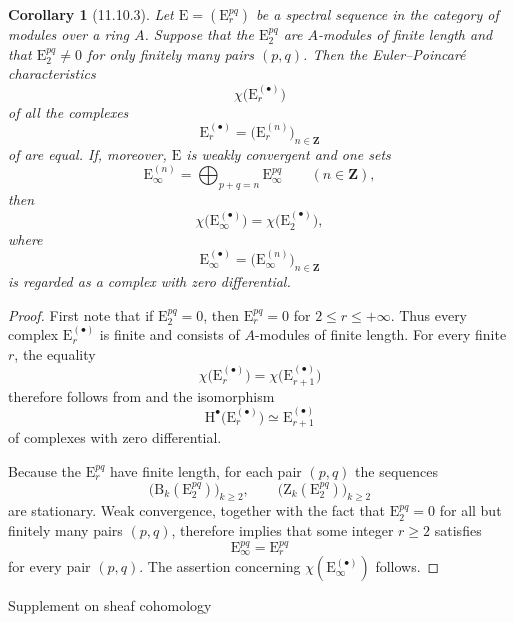 \documentclass[oneside]{amsart}
\makeatletter
\theoremstyle{ega-env-style}
\theoremstyle{ega-thm-env-style}
\newtheorem*{corollary}{Corollary}
\theoremstyle{ega-defn-env-style}
\def\section{\@startsection{section}{1}%
  \z@{.7\linespacing\@plus\linespacing}{.5\linespacing}%
  {\normalfont\bfseries\Large\scshape\centering}}
\def\bb{\mathbf}                    %
\def\leq{\leqslant}                 %
\def\geq{\geqslant}                 %
\def\HH{\mathrm{H}}                 %
\let\EGAOriginalLabel\label
\renewcommand{\label}[1]{\phantomsection\EGAOriginalLabel{#1}}
\makeatother
\begin{document}
\begin{corollary}[11.10.3]
\label{0.11.10.3}
Let $\mathrm{E}=(\mathrm{E}_r^{pq})$ be a spectral sequence in the
category of modules over a ring $A$.
Suppose that the $\mathrm{E}_2^{pq}$ are $A$-modules of finite length and
that $\mathrm{E}_2^{pq}\neq0$ for only finitely many pairs $(p,q)$.
Then the Euler--Poincar\'e characteristics
\[
  \chi\bigl(\mathrm{E}_r^{(\bullet)}\bigr)
\]
of all the complexes
\[
  \mathrm{E}_r^{(\bullet)}
  =
  \bigl(\mathrm{E}_r^{(n)}\bigr)_{n\in\bb{Z}}
\]
of  are equal.
If, moreover, $\mathrm{E}$ is weakly convergent and one sets
\[
  \mathrm{E}_\infty^{(n)}
  =
  \bigoplus_{p+q=n}\mathrm{E}_\infty^{pq}
  \qquad(n\in\bb{Z}),
\]
then
\[
  \chi\bigl(\mathrm{E}_\infty^{(\bullet)}\bigr)
  =
  \chi\bigl(\mathrm{E}_2^{(\bullet)}\bigr),
\]
where
\[
  \mathrm{E}_\infty^{(\bullet)}
  =
  \bigl(\mathrm{E}_\infty^{(n)}\bigr)_{n\in\bb{Z}}
\]
is regarded as a complex with zero differential.
\end{corollary}

\begin{proof}
First note that if $\mathrm{E}_2^{pq}=0$, then
$\mathrm{E}_r^{pq}=0$ for $2\leq r\leq+\infty$.
Thus every complex $\mathrm{E}_r^{(\bullet)}$ is finite and consists of
$A$-modules of finite length.
For every finite $r$, the equality
\[
  \chi\bigl(\mathrm{E}_r^{(\bullet)}\bigr)
  =
  \chi\bigl(\mathrm{E}_{r+1}^{(\bullet)}\bigr)
\]
therefore follows from  and the isomorphism
\[
  \HH^\bullet\bigl(\mathrm{E}_r^{(\bullet)}\bigr)
  \simeq
  \mathrm{E}_{r+1}^{(\bullet)}
\]
of complexes with zero differential.

Because the $\mathrm{E}_r^{pq}$ have finite length, for each pair
$(p,q)$ the sequences
\[
  \bigl(\mathrm{B}_k(\mathrm{E}_2^{pq})\bigr)_{k\geq2},
  \qquad
  \bigl(\mathrm{Z}_k(\mathrm{E}_2^{pq})\bigr)_{k\geq2}
\]
are stationary.
Weak convergence, together with the fact that
$\mathrm{E}_2^{pq}=0$ for all but finitely many pairs $(p,q)$, therefore
implies that some integer $r\geq2$ satisfies
\[
  \mathrm{E}_\infty^{pq}=\mathrm{E}_r^{pq}
\]
for every pair $(p,q)$.
The assertion concerning
$\chi(\mathrm{E}_\infty^{(\bullet)})$ follows.
\end{proof}
\section{Supplement on sheaf cohomology}
\label{section:0.12}
\end{document}
